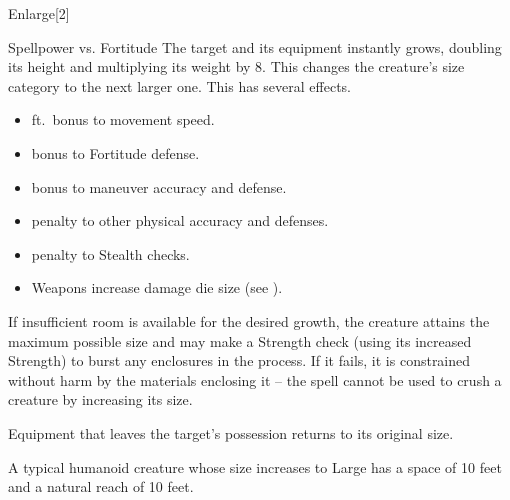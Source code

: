 \begin{spellsection}{Enlarge}[2]
    \begin{spellheader}
    \end{spellheader}
    \begin{spellcontent}
        \begin{spelltargetinginfo}
        \end{spelltargetinginfo}
        \begin{spelleffects}
            \begin{spellattack}{Spellpower vs. Fortitude}
                \spellsuccess The target and its equipment instantly grows, doubling its height and multiplying its weight by 8. This changes the creature's size category to the next larger one. This has several effects.
                \begin{itemize}
                    \item {} ft.\ bonus to movement speed.
                    \item {} bonus to Fortitude defense.
                    \item {} bonus to maneuver accuracy and defense.
                    \item {} penalty to other physical accuracy and defenses.
                    \item {} penalty to Stealth checks.
                    \item Weapons increase damage die size (see ).
                \end{itemize}
                \par If insufficient room is available for the desired growth, the creature attains the maximum possible size and may make a Strength check (using its increased Strength) to burst any enclosures in the process. If it fails, it is constrained without harm by the materials enclosing it -- the spell cannot be used to crush a creature by increasing its size.
                \par Equipment that leaves the target's possession returns to its original size.
            \end{spellattack}
            \spelldur \durshort \dismissable
        \end{spelleffects}
    \end{spellcontent}
    \begin{spellfooter}
        \spellnotes A typical humanoid creature whose size increases to Large has a space of 10 feet and a natural reach of 10 feet. \sizingspellnotes
        \miscastrandom
    \end{spellfooter}
    \begin{spellaugments}
    \end{spellaugments}
\end{spellsection}

